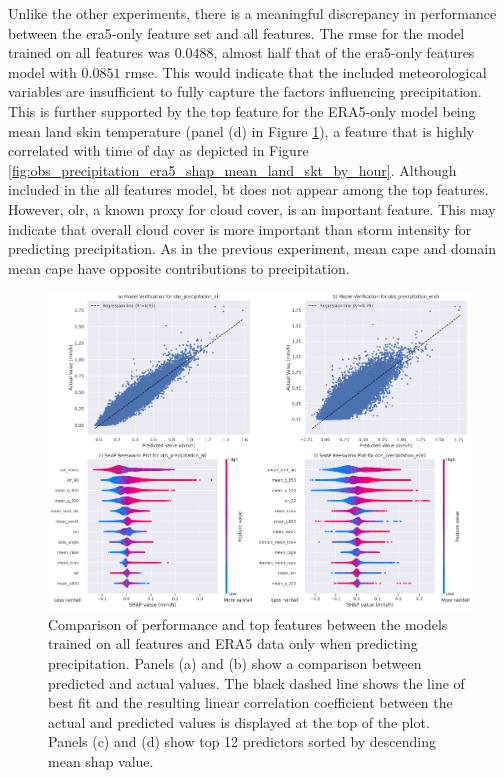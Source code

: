 Unlike the other experiments, there is a meaningful discrepancy in performance between the \acrshort{era5}-only feature set and all features. The \acrshort{rmse} for the model trained on all features was $0.0488$, almost half that of the \acrshort{era5}-only features model with $0.0851$ \acrshort{rmse}. This would indicate that the included meteorological variables are insufficient to fully capture the factors influencing precipitation. This is further supported by the top feature for the ERA5-only model being mean land skin temperature (panel (d) in Figure \ref{fig:obs_precipitation_summary}), a feature that is highly correlated with time of day as depicted in Figure \ref{fig:obs_precipitation_era5_shap_mean_land_skt_by_hour}. Although included in the all features model, \acrfull{bt} does not appear among the top features. However, \acrfull{olr}, a known proxy for cloud cover, is an important feature. This may indicate that overall cloud cover is more important than storm intensity for predicting precipitation. As in the previous experiment, mean \acrshort{cape} and domain mean \acrshort{cape} have opposite contributions to precipitation.

\begin{figure}[ht]
    \centering
    \includegraphics[width=\textwidth]{../figures/generated/experiments/obs_precipitation/obs_precipitation_summary.png}
    \caption{Comparison of performance and top features between the models trained on all features and ERA5 data only when predicting precipitation. Panels (a) and (b) show a comparison between predicted and actual values. The black dashed line shows the line of best fit and the resulting linear correlation coefficient between the actual and predicted values is displayed at the top of the plot. Panels (c) and (d) show top 12 predictors sorted by descending mean \acrshort{shap} value.}
    \label{fig:obs_precipitation_summary}
\end{figure}

